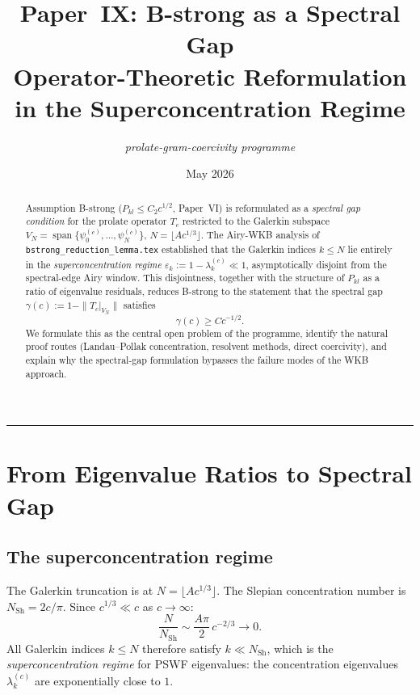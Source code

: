 \documentclass[12pt,a4paper]{article}
\title{%
  \textbf{Paper~IX: B-strong as a Spectral Gap}\\[0.4em]
  \large Operator-Theoretic Reformulation
  in the Superconcentration Regime
}
\author{\textit{prolate-gram-coercivity programme}}
\date{May 2026}
\newcommand{\lam}[1]{\lambda_{#1}^{(c)}}
\newcommand{\pswf}[1]{\psi_{#1}^{(c)}}
\newcommand{\Tc}{T_c}
\newcommand{\VN}{V_N}
\begin{document}
\maketitle

\begin{abstract}
Assumption B-strong ($P_{kl} \leq C_2 c^{1/2}$, Paper~VI) is
reformulated as a \emph{spectral gap condition} for the
prolate operator $\Tc$ restricted to the Galerkin subspace
$\VN = \operatorname{span}\{\pswf{0},\ldots,\pswf{N}\}$,
$N = \lfloor Ac^{1/3}\rfloor$.
The Airy-WKB analysis of \texttt{bstrong\_reduction\_lemma.tex}
established that the Galerkin indices $k \leq N$ lie entirely
in the \emph{superconcentration regime}
$\varepsilon_k := 1 - \lam{k} \ll 1$,
asymptotically disjoint from the spectral-edge Airy window.
This disjointness, together with the structure of $P_{kl}$
as a ratio of eigenvalue residuals, reduces B-strong to the
statement that the spectral gap
$\gamma(c) := 1 - \|\Tc|_{\VN}\|$
satisfies
\[
  \gamma(c) \geq C c^{-1/2}.
\]
We formulate this as the central open problem of the
programme, identify the natural proof routes
(Landau--Pollak concentration, resolvent methods, direct
coercivity), and explain why the spectral-gap formulation
bypasses the failure modes of the WKB approach.
\end{abstract}

\tableofcontents
\bigskip\hrule\bigskip

\section{From Eigenvalue Ratios to Spectral Gap}
\label{sec:reduction}

\subsection{The superconcentration regime}

The Galerkin truncation is at $N = \lfloor Ac^{1/3}\rfloor$.
The Slepian concentration number is $N_{\mathrm{Sh}} = 2c/\pi$.
Since $c^{1/3} \ll c$ as $c \to \infty$:
\[
  \frac{N}{N_{\mathrm{Sh}}} \sim \frac{A\pi}{2}\,c^{-2/3} \to 0.
\]
All Galerkin indices $k \leq N$ therefore satisfy
$k \ll N_{\mathrm{Sh}}$, which is the \emph{superconcentration
regime} for PSWF eigenvalues: the concentration eigenvalues
$\lam{k}$ are exponentially close to $1$.
\end{document}
